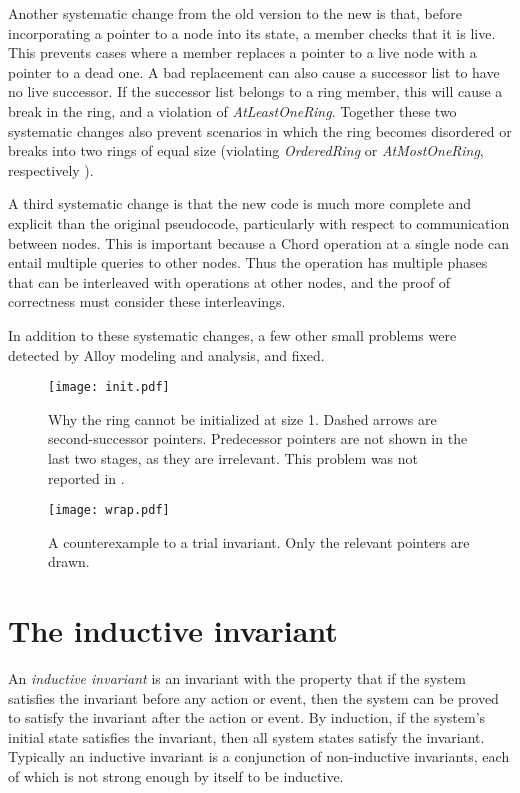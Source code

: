\documentclass[conference]{IEEEtran}
\begin{document}
Another systematic change from the old version to the new is that,
before incorporating a pointer to a node into its state, a
member checks that it is live.
This prevents cases where a member replaces a pointer to a live node with
a pointer to a dead one.
A bad replacement can also cause a successor list to have no live
successor.
If the successor list belongs to a ring member, this will cause a
break in the ring, and a 
violation of {\it AtLeastOneRing}.
Together these two systematic changes also prevent
scenarios in which the ring becomes disordered or breaks into
two rings of equal size
(violating {\it OrderedRing} or {\it AtMostOneRing}, respectively
\cite{chord-ccr}).

A third systematic change is that the new code
is much more complete and explicit than the original
pseudocode, particularly with respect to communication
between nodes.
This is important because a Chord operation at a single node
can entail multiple
queries to other nodes.
Thus the operation has multiple phases that can be interleaved with
operations at other nodes, and the proof of correctness must consider
these interleavings.

In addition to these systematic changes, a few other small problems
were detected by Alloy modeling and analysis, and fixed.

\begin{figure*}
\centering
\texttt{[image: init.pdf]}
\caption{Why the ring cannot be initialized at size 1.
Dashed arrows are second-successor pointers.
Predecessor pointers are not shown in the last two stages, as they are
irrelevant.
This problem was not reported in \cite{chord-ccr}.}
\label{fig:init}
\end{figure*}

\begin{figure*}
\centering
\texttt{[image: wrap.pdf]}
\caption{A counterexample to a trial invariant.
Only the relevant pointers are drawn.}
\label{fig:wrap}
\end{figure*}

\section{The inductive invariant}
\label{sec:additional}

An {\it inductive invariant} is an invariant with the property that
if the system satisfies the invariant before any action or event,
then the system can be proved to satisfy the invariant after the 
action or event.
By induction, if the system's initial state satisfies the invariant,
then all system states satisfy the invariant.
Typically an inductive invariant is a conjunction of non-inductive
invariants, each of which is not strong enough by itself to be inductive.
\end{document}
